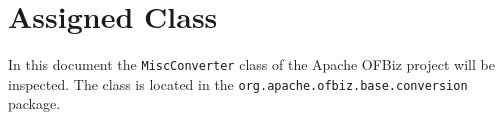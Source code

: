 \section{Assigned Class}
In this document the \texttt{MiscConverter} class of the Apache OFBiz project \cite{ofbiz} will be inspected. The class is located in the \texttt{org.apache.ofbiz.base.conversion} package.

